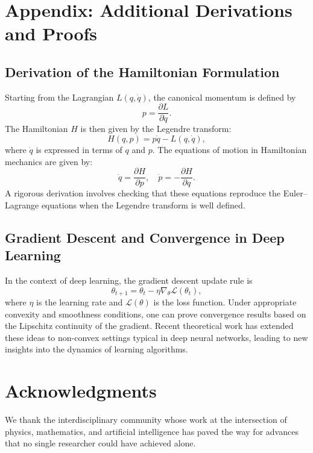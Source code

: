 \documentclass[11pt,a4paper]{article}
\begin{document}
\appendix
\section{Appendix: Additional Derivations and Proofs}

\subsection{Derivation of the Hamiltonian Formulation}

Starting from the Lagrangian \(L(q,\dot{q})\), the canonical momentum is defined by
\[
p = \frac{\partial L}{\partial \dot{q}}.
\]
The Hamiltonian \(H\) is then given by the Legendre transform:
\[
H(q,p) = p \dot{q} - L(q,\dot{q}),
\]
where \(\dot{q}\) is expressed in terms of \(q\) and \(p\). The equations of motion in Hamiltonian mechanics are given by:
\[
\dot{q} = \frac{\partial H}{\partial p}, \quad \dot{p} = -\frac{\partial H}{\partial q}.
\]
A rigorous derivation involves checking that these equations reproduce the Euler--Lagrange equations when the Legendre transform is well defined.

\subsection{Gradient Descent and Convergence in Deep Learning}

In the context of deep learning, the gradient descent update rule is
\[
\theta_{t+1} = \theta_t - \eta \nabla_\theta \mathcal{L}(\theta_t),
\]
where \(\eta\) is the learning rate and \(\mathcal{L}(\theta)\) is the loss function. Under appropriate convexity and smoothness conditions, one can prove convergence results based on the Lipschitz continuity of the gradient. Recent theoretical work has extended these ideas to non-convex settings typical in deep neural networks, leading to new insights into the dynamics of learning algorithms.

\section*{Acknowledgments}

We thank the interdisciplinary community whose work at the intersection of physics, mathematics, and artificial intelligence has paved the way for advances that no single researcher could have achieved alone.
\end{document}
